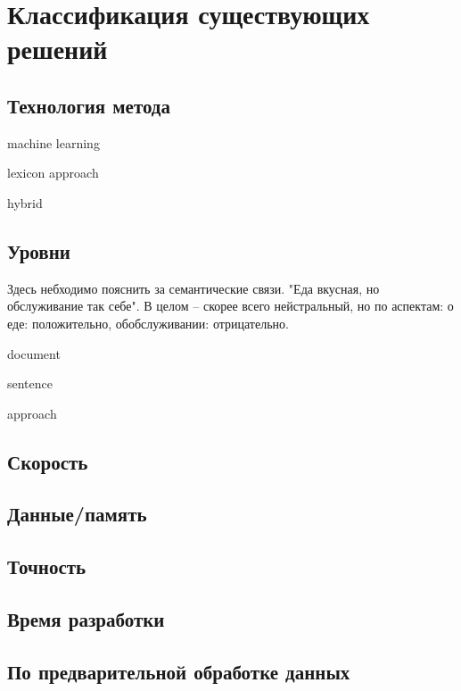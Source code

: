 \chapter{Классификация существующих решений}

\section{Технология метода}
machine learning

lexicon approach

hybrid

\section{Уровни}

Здесь небходимо пояснить за семантические связи. "Еда вкусная, но
обслуживание так себе". В целом -- скорее всего нейстральный, но по аспектам:
о еде: положительно, обобслуживании: отрицательно.

document

sentence

approach

\section{Скорость}

\section{Данные/память}

\section{Точность}

\section{Время разработки}

\section{По предварительной обработке данных}
